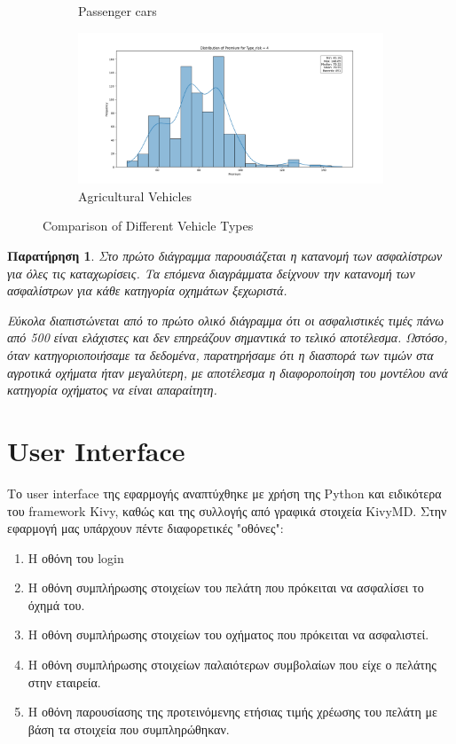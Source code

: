 \documentclass{llncs}
\newtheorem{observation}{Παρατήρηση}
\begin{document}
\begin{figure}
\begin{subfigure}{0.45\linewidth}
       \caption{Passenger cars}
       \label{fig:subfig3}
        \end{subfigure}
         \begin{subfigure}{0.45\linewidth}
        \includegraphics[width=\linewidth]{images/premium_risk4.png}
        \caption{Agricultural Vehicles}
        \label{fig:subfig4}
         \end{subfigure}
  \caption{Comparison of Different Vehicle Types}
  \label{fig:subfigures4}
\end{figure}


\begin{observation}
    Στο πρώτο διάγραμμα παρουσιάζεται η κατανομή των ασφαλίστρων για όλες τις καταχωρίσεις. Τα επόμενα διαγράμματα δείχνουν την κατανομή των ασφαλίστρων για κάθε κατηγορία οχημάτων ξεχωριστά.

    Εύκολα διαπιστώνεται από το πρώτο ολικό διάγραμμα ότι οι ασφαλιστικές τιμές πάνω από 500 είναι ελάχιστες και δεν επηρεάζουν σημαντικά το τελικό αποτέλεσμα. Ωστόσο, όταν κατηγοριοποιήσαμε τα δεδομένα, παρατηρήσαμε ότι η διασπορά των τιμών στα αγροτικά οχήματα ήταν μεγαλύτερη, με αποτέλεσμα η διαφοροποίηση του μοντέλου ανά κατηγορία οχήματος να είναι απαραίτητη.
\end{observation}

\section{User Interface}
Το user interface της εφαρμογής αναπτύχθηκε με χρήση της Python και ειδικότερα του framework Kivy, καθώς και της συλλογής από γραφικά στοιχεία KivyMD. Στην εφαρμογή μας υπάρχουν πέντε διαφορετικές "οθόνες":
\begin{enumerate}
    \item Η οθόνη του login
    \item Η οθόνη συμπλήρωσης στοιχείων του πελάτη που πρόκειται να ασφαλίσει το όχημά του.
    \item Η οθόνη συμπλήρωσης στοιχείων του οχήματος που πρόκειται να ασφαλιστεί.
    \item Η οθόνη συμπλήρωσης στοιχείων παλαιότερων συμβολαίων που είχε ο πελάτης στην εταιρεία.
    \item Η οθόνη παρουσίασης της προτεινόμενης ετήσιας τιμής χρέωσης του πελάτη με βάση τα στοιχεία που συμπληρώθηκαν.
\end{enumerate}
\end{document}
